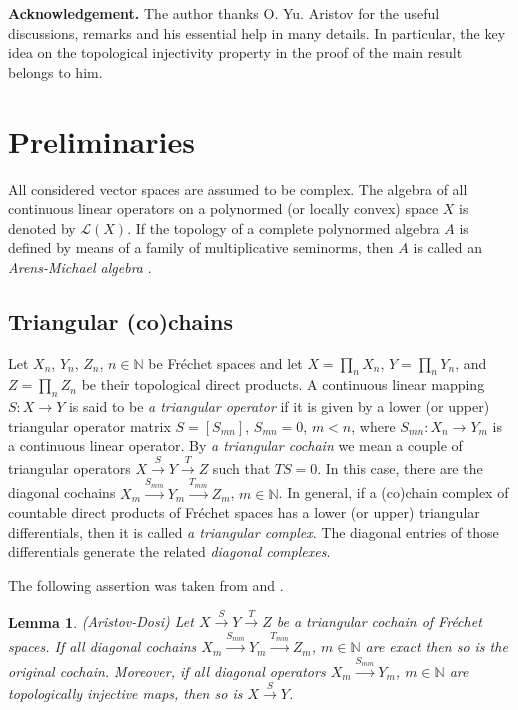 \documentclass[12pt,reqno]{amsart}%
\theoremstyle{plain}
\newtheorem{lemma}{Lemma}
\numberwithin{theorem}{section} \numberwithin{equation}{section}
\numberwithin{lemma}{section}
\numberwithin{remark}{section}
\numberwithin{example}{section}
\numberwithin{proposition}{section}
\numberwithin{definition}{section}
\numberwithin{corollary}{section}
\begin{document}
\textbf{Acknowledgement. }The author thanks O. Yu. Aristov for the useful
discussions, remarks and his essential help in many details. In particular,
the key idea on the topological injectivity property in the proof of the main
result belongs to him.

\section{Preliminaries\label{sPre}}

All considered vector spaces are assumed to be complex. The algebra of all
continuous linear operators on a polynormed (or locally convex) space $X$ is
denoted by $\mathcal{L}\left(  X\right)  $. If the topology of a complete
polynormed algebra $A$ is defined by means of a family of multiplicative
seminorms, then $A$ is called an \textit{Arens-Michael algebra} \cite[1.2.4]%
{Hel}.

\subsection{Triangular (co)chains\label{subsecTCs}}

Let $X_{n}$, $Y_{n}$, $Z_{n}$, $n\in\mathbb{N}$ be Fr\'{e}chet spaces and let
$X=\prod_{n}X_{n}$, $Y=\prod_{n}Y_{n}$, and $Z=\prod_{n}Z_{n}$ be their
topological direct products. A continuous linear mapping $S:X\rightarrow Y$ is
said to be \textit{a triangular operator} if it is given by a lower (or upper)
triangular operator matrix $S=\left[  S_{mn}\right]  $, $S_{mn}=0$, $m<n$,
where $S_{mn}:X_{n}\rightarrow Y_{m}$ is a continuous linear operator. By
\textit{a triangular cochain} we mean a couple of triangular operators
$X\overset{S}{\longrightarrow}Y\overset{T}{\longrightarrow}Z$ such that
$TS=0$. In this case, there are the diagonal cochains $X_{m}\overset{S_{mm}%
}{\longrightarrow}Y_{m}\overset{T_{mm}}{\longrightarrow}Z_{m}$, $m\in
\mathbb{N}$. In general, if a (co)chain complex of countable direct products
of Fr\'{e}chet spaces has a lower (or upper) triangular differentials, then it
is called \textit{a triangular complex}. The diagonal entries of those
differentials generate the related \textit{diagonal complexes}.

The following assertion was taken from \cite[Proposition 4.2]{DMedJM09} and
\cite{Aris}.

\begin{lemma}
\label{lemTri}(Aristov-Dosi) Let $X\overset{S}{\longrightarrow}%
Y\overset{T}{\longrightarrow}Z$ be a triangular cochain of Fr\'{e}chet spaces.
If all diagonal cochains $X_{m}\overset{S_{mm}}{\longrightarrow}%
Y_{m}\overset{T_{mm}}{\longrightarrow}Z_{m}$, $m\in\mathbb{N}$ are exact then
so is the original cochain. Moreover, if all diagonal operators $X_{m}%
\overset{S_{mm}}{\longrightarrow}Y_{m}$, $m\in\mathbb{N}$ are topologically
injective maps, then so is $X\overset{S}{\longrightarrow}Y$.
\end{lemma}
\end{document}
